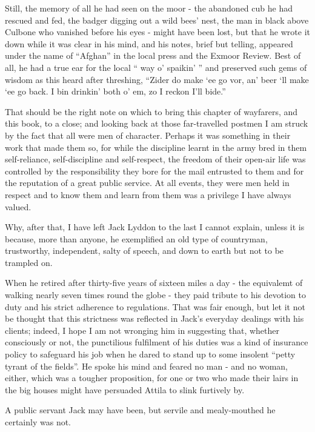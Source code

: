 Still, the memory of all he had seen on the moor - the abandoned cub he had rescued and fed, the badger digging out a wild bees’ nest, the man in black above Culbone who vanished before his eyes - might have been lost, but that he wrote it down while it was clear in his mind, and his notes, brief but telling, appeared under the name of “Afghan” in the local press and the Exmoor Review. Best of all, he had a true ear for the local “ way o’ spaikin’ ” and preserved such gems of wisdom as this heard after threshing, “Zider do make ‘ee go vor, an’ beer ‘ll make ‘ee go back. I bin drinkin’ both o’ em, zo I reckon I’ll bide.”
	
That should be the right note on which to bring this chapter of wayfarers, and this book, to a close; and looking back at those far-travelled postmen I am struck by the fact that all were men of character. Perhaps it was something in their work that made them so, for while the discipline learnt in the army bred in them self-reliance, self-discipline and self-respect, the freedom of their open-air life was controlled by the responsibility they bore for the mail entrusted to them and for the reputation of a great public service. At all events, they were men held in respect and to know them and learn from them was a privilege I have always valued.

Why, after that, I have left Jack Lyddon to the last I cannot explain, unless it is because, more than anyone, he exemplified an old type of countryman, trustworthy, independent, salty of speech, and down to earth but not to be trampled on. 

When he retired after thirty-five years of sixteen miles a day - the equivalemt of walking nearly seven times round the globe - they paid tribute to his devotion to duty and his strict adherence to regulations. That was fair enough, but let it not be thought that this strictness was reflected in Jack’s everyday dealings with his clients; indeed, I hope I am not wronging him in suggesting that, whether consciously or not, the punctilious fulfilment of his duties was a kind of insurance policy to safeguard his job when he dared to stand up to some insolent “petty tyrant of the fields”. He spoke his mind and feared no man - and no woman, either, which was a tougher proposition, for one or two who made their lairs in the big houses might have persuaded Attila to slink furtively by.

A public servant Jack may have been, but servile and mealy-mouthed he certainly was not.

